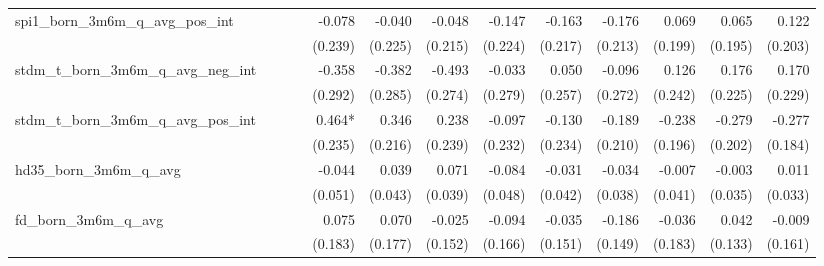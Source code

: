 \begin{tabular}{lrrrrrrrrrrrr}
spi1\_born\_3m6m\_q\_avg\_pos\_int          &              &              &              &       -0.078 &       -0.040 &       -0.048 &       -0.147 &       -0.163 &       -0.176 &        0.069 &        0.065 &        0.122 \\ 
                                            &              &              &              &      (0.239) &      (0.225) &      (0.215) &      (0.224) &      (0.217) &      (0.213) &      (0.199) &      (0.195) &      (0.203) \\ 
stdm\_t\_born\_3m6m\_q\_avg\_neg\_int       &              &              &              &       -0.358 &       -0.382 &       -0.493 &       -0.033 &        0.050 &       -0.096 &        0.126 &        0.176 &        0.170 \\ 
                                            &              &              &              &      (0.292) &      (0.285) &      (0.274) &      (0.279) &      (0.257) &      (0.272) &      (0.242) &      (0.225) &      (0.229) \\ 
stdm\_t\_born\_3m6m\_q\_avg\_pos\_int       &              &              &              &       0.464* &        0.346 &        0.238 &       -0.097 &       -0.130 &       -0.189 &       -0.238 &       -0.279 &       -0.277 \\ 
                                            &              &              &              &      (0.235) &      (0.216) &      (0.239) &      (0.232) &      (0.234) &      (0.210) &      (0.196) &      (0.202) &      (0.184) \\ 
hd35\_born\_3m6m\_q\_avg                    &              &              &              &       -0.044 &        0.039 &        0.071 &       -0.084 &       -0.031 &       -0.034 &       -0.007 &       -0.003 &        0.011 \\ 
                                            &              &              &              &      (0.051) &      (0.043) &      (0.039) &      (0.048) &      (0.042) &      (0.038) &      (0.041) &      (0.035) &      (0.033) \\ 
fd\_born\_3m6m\_q\_avg                      &              &              &              &        0.075 &        0.070 &       -0.025 &       -0.094 &       -0.035 &       -0.186 &       -0.036 &        0.042 &       -0.009 \\ 
                                            &              &              &              &      (0.183) &      (0.177) &      (0.152) &      (0.166) &      (0.151) &      (0.149) &      (0.183) &      (0.133) &      (0.161) \\ 

\end{tabular}
